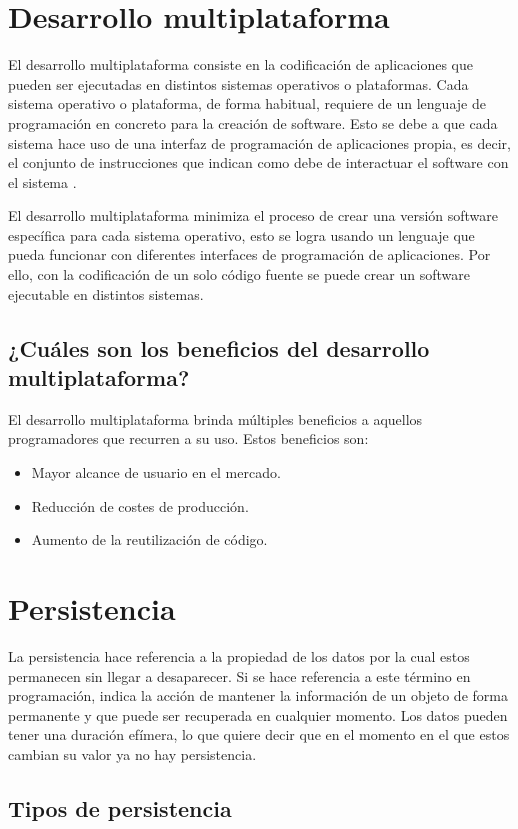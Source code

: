 \section{Desarrollo multiplataforma}
El desarrollo multiplataforma consiste en la codificación de aplicaciones que pueden ser ejecutadas en distintos sistemas operativos o plataformas. Cada sistema operativo o plataforma, de forma habitual, requiere de un lenguaje de programación en concreto para la creación de software. Esto se debe a que cada sistema hace uso de una interfaz de programación de aplicaciones propia, es decir, el conjunto de instrucciones que indican como debe de interactuar el software con el sistema \cite{multiplataforma}.

El desarrollo multiplataforma minimiza el proceso de crear una versión software específica para cada sistema operativo, esto se logra usando un lenguaje que pueda funcionar con diferentes interfaces de programación de aplicaciones. Por ello, con la codificación de un solo código fuente se puede crear un software ejecutable en distintos sistemas.

\subsection{¿Cuáles son los beneficios del desarrollo multiplataforma?}
El desarrollo multiplataforma brinda múltiples beneficios a aquellos programadores que recurren a su uso. Estos beneficios son:
\begin{itemize}
    \item Mayor alcance de usuario en el mercado.
    \item Reducción de costes de producción.
    \item Aumento de la reutilización de código.
\end{itemize}

\section{Persistencia}
La persistencia hace referencia a la propiedad de los datos por la cual estos permanecen sin llegar a desaparecer. Si se hace referencia a este término en programación, indica la acción de mantener la información de un objeto de forma permanente y que puede ser recuperada en cualquier momento.
Los datos pueden tener una duración efímera, lo que quiere decir que en el momento en el que estos cambian su valor ya no hay persistencia.

\subsection{Tipos de persistencia}
